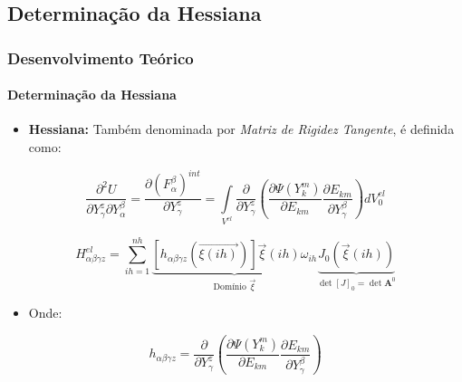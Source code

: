\documentclass{beamer}
\begin{document}
\begin{frame}

\end{frame}



\subsection{Determinação da Hessiana}
\begin{frame}
    \frametitle{Desenvolvimento Teórico}
    \framesubtitle{Determinação da Hessiana}
    \begin{itemize}
        \item \textbf{Hessiana:} Também denominada por \textit{Matriz de Rigidez Tangente}, é definida como:
    \end{itemize}



    \begin{equation}
        \frac{\partial^2 U}{ \partial Y_\gamma^z   \partial Y_\alpha^\beta} 
        = 
        \frac{\partial \left(F_\alpha^\beta\right)^{int}}{\partial Y_\gamma^z}
        =
        \int\limits_{V^{el}} \frac{\partial}{\partial Y_\gamma^z}\left(\frac{\partial \Psi(Y_k^m)}{\partial E_{km}} \frac{\partial E_{km}}{\partial Y_\gamma^\beta} \right) dV^{el}_0
    \end{equation}

    \begin{equation}
        H_{\alpha\beta\gamma z}^{el}
        = 
        \sum_{ih=1}^{nh} \underbrace{\left[h_{\alpha\beta\gamma z}\left(\vec{\xi(ih)}\right)\right] \vec{\xi}(ih)\omega_{ih}}_{\text{Domínio }\vec{\xi}} \underbrace{J_0 \left(\vec{\xi}(ih)\right)}_{\det \left[J\right]_0 = \det \mathbf{A}^0}
    \end{equation}

    \begin{itemize}
        \item Onde:
    \end{itemize}
    
    \begin{equation}
        h_{\alpha\beta\gamma z} = 
        \frac{\partial}{\partial Y_\gamma^z}\left(\frac{\partial \Psi(Y_k^m)}{\partial E_{km}} \frac{\partial E_{km}}{\partial Y_\gamma^\beta} \right)
    \end{equation}

\end{frame}
\end{document}

